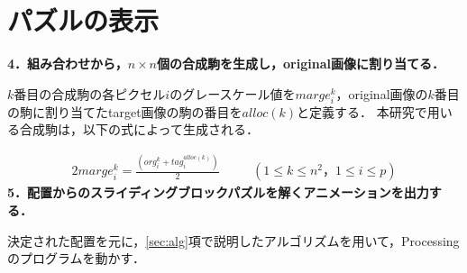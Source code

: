 \section{パズルの表示}
    \noindent
    \textbf{4．組み合わせから，$n \times n$個の合成駒を生成し，original画像に割り当てる．}
    
    $k$番目の合成駒の各ピクセル$i$のグレースケール値を$marge^{k}_{i}$，original画像の$k$番目の駒に割り当てたtarget画像の駒の番目を$alloc(k)$と定義する．
    本研究で用いる合成駒は，以下の式によって生成される．

    \begin{alignat*}{2}
        marge^{k}_{i}=\frac{(org^{k}_{i}+tag^{alloc(k)}_{i})}{2} & \quad & (1\leq k \leq n^2，1\leq i \leq p)
    \end{alignat*}
    \noindent
    \textbf{5．配置からのスライディングブロックパズルを解くアニメーションを出力する．}

    決定された配置を元に，\ref{sec:alg}項で説明したアルゴリズムを用いて，Processingのプログラムを動かす．


